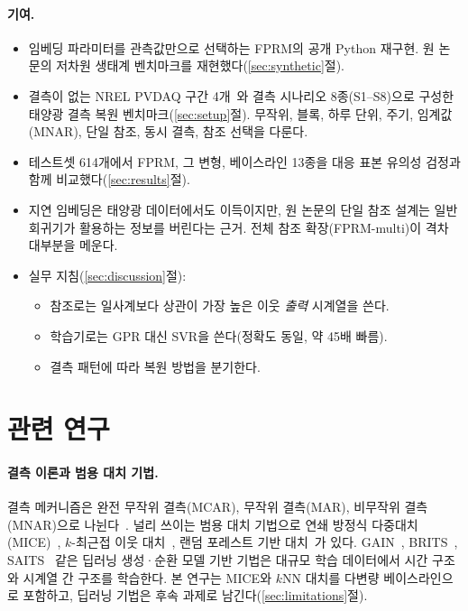 \documentclass[11pt,a4paper]{article}
\begin{document}
\paragraph{기여.}
\begin{itemize}
  \item 임베딩 파라미터를 관측값만으로 선택하는 FPRM의 공개 Python 재구현. 원 논문의 저차원 생태계 벤치마크를 재현했다(\ref{sec:synthetic}절).
  \item 결측이 없는 NREL PVDAQ 구간 4개~\cite{pvdaq}와 결측 시나리오 8종(S1--S8)으로 구성한 태양광 결측 복원 벤치마크(\ref{sec:setup}절). 무작위, 블록, 하루 단위, 주기, 임계값(MNAR), 단일 참조, 동시 결측, 참조 선택을 다룬다.
  \item 테스트셋 614개에서 FPRM, 그 변형, 베이스라인 13종을 대응 표본 유의성 검정과 함께 비교했다(\ref{sec:results}절).
  \item 지연 임베딩은 태양광 데이터에서도 이득이지만, 원 논문의 단일 참조 설계는 일반 회귀기가 활용하는 정보를 버린다는 근거. 전체 참조 확장(FPRM-multi)이 격차 대부분을 메운다.
  \item 실무 지침(\ref{sec:discussion}절):
  \begin{itemize}
    \item 참조로는 일사계보다 상관이 가장 높은 이웃 \emph{출력} 시계열을 쓴다.
    \item 학습기로는 GPR 대신 SVR을 쓴다(정확도 동일, 약 45배 빠름).
    \item 결측 패턴에 따라 복원 방법을 분기한다.
  \end{itemize}
\end{itemize}

\section{관련 연구}\label{sec:related}

\paragraph{결측 이론과 범용 대치 기법.}
결측 메커니즘은 완전 무작위 결측(MCAR), 무작위 결측(MAR), 비무작위 결측(MNAR)으로 나뉜다~\cite{rubin1976,little2019}.
널리 쓰이는 범용 대치 기법으로 연쇄 방정식 다중대치(MICE)~\cite{vanbuuren2011}, $k$-최근접 이웃 대치~\cite{troyanskaya2001}, 랜덤 포레스트 기반 대치~\cite{breiman2001,stekhoven2012}가 있다.
GAIN~\cite{yoon2018gain}, BRITS~\cite{cao2018brits}, SAITS~\cite{du2023saits} 같은 딥러닝 생성·순환 모델 기반 기법은 대규모 학습 데이터에서 시간 구조와 시계열 간 구조를 학습한다.
본 연구는 MICE와 $k$NN 대치를 다변량 베이스라인으로 포함하고, 딥러닝 기법은 후속 과제로 남긴다(\ref{sec:limitations}절).
\end{document}
